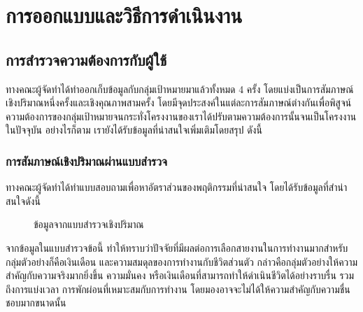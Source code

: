 \chapter{การออกแบบและวิธีการดำเนินงาน}

\section{การสำรวจความต้องการกับผู้ใช้}
ทางคณะผู้จัดทำได้ทำออกเก็บข้อมูลกับกลุ่มเป้าหมายมาแล้วทั้งหมด 4 ครั้ง โดยแบ่งเป็นการสัมภาษณ์เชิงปริมาณหนึ่งครั้งและเชิงคุณภาพสามครั้ง  โดยมีจุดประสงค์ในแต่ละการสัมภาษณ์ต่างกันเพื่อพิสูจน์ความต้องการของกลุ่มเป้าหมายจนกระทั่งโครงงานของเราได้ปรับตามความต้องการนั้นจนเป็นโครงงานในปัจจุบัน อย่างไรก็ตาม เรายังได้รับข้อมูลที่น่าสนใจเพิ่มเติมโดยสรุป ดังนี้

\subsection{การสัมภาษณ์เชิงปริมาณผ่านแบบสำรวจ}
ทางคณะผู้จัดทำได้ทำแบบสอบถามเพื่อหาอัตราส่วนของพฤติกรรมที่น่าสนใจ โดยได้รับข้อมูลที่สำน่าสนใจดังนี้
\begin{figure}[!h]\centering
    \setlength{\fboxrule}{0.2mm} %
    \setlength{\fboxsep}{0.5cm}
    \caption{ข้อมูลจากแบบสำรวจเชิงปริมาณ}\label{fig:insightPoll}
\end{figure}
จากข้อมูลในแบบสำรวจข้อนี้ ทำให้ทราบว่าปัจจัยที่มีผลต่อการเลือกสายงานในการทำงานมากสำหรับกลุ่มตัวอย่างก็คือเงินเดือน และความสมดุลของการทำงานกับชีวิตส่วนตัว กล่าวคือกลุ่มตัวอย่างให้ความสำคัญกับความจริงมากยิ่งขึ้น ความมั่นคง หรือเงินเดือนที่สามารถทำให้ดำเนินชีวิตได้อย่างราบรื่น รวมถึงการแบ่งเวลา การพักผ่อนที่เหมาะสมกับการทำงาน โดยมองอาจจะไม่ได้ให้ความสำคัญกับความชื่นชอบมากขนาดนั้น

